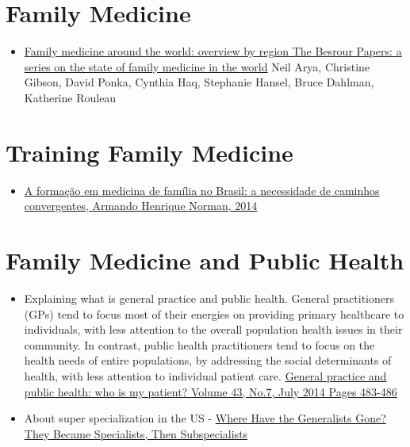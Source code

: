 \documentclass[]{book}
\providecommand{\tightlist}{%
  \setlength{\itemsep}{0pt}\setlength{\parskip}{0pt}}
\begin{document}
\begin{itemize}
\end{itemize}

\hypertarget{family-medicine}{%
\section*{Family Medicine}\label{family-medicine}}

\begin{itemize}
\tightlist
\item
  \href{https://www.ncbi.nlm.nih.gov/pmc/articles/PMC5471080/pdf/0630436.pdf}{Family medicine around the world: overview by region The Besrour Papers: a series on the state of family medicine in the world} Neil Arya, Christine Gibson, David Ponka, Cynthia Haq, Stephanie Hansel, Bruce Dahlman, Katherine Rouleau
\end{itemize}

\hypertarget{training-family-medicine}{%
\section*{Training Family Medicine}\label{training-family-medicine}}

\begin{itemize}
\tightlist
\item
  \href{https://www.rbmfc.org.br/rbmfc/article/view/875}{A formação em medicina de família no Brasil: a necessidade de caminhos convergentes, Armando Henrique Norman, 2014}
\end{itemize}

\hypertarget{family-medicine-and-public-health}{%
\section*{Family Medicine and Public Health}\label{family-medicine-and-public-health}}

\begin{itemize}
\item
  Explaining what is general practice and public health. General practitioners (GPs) tend to focus most of their energies on providing primary healthcare to individuals, with less attention to the overall population health issues in their community. In contrast, public health practitioners tend to focus on the health needs of entire populations, by addressing the social determinants of health, with less attention to individual patient care.
  \href{https://www.racgp.org.au/afp/2014/july/who-is-my-patient/}{General practice and public health: who is my patient? Volume 43, No.7, July 2014 Pages 483-486}
\item
  About super specialization in the US - \href{https://www.amjmed.com/article/S0002-9343\%2817\%2930134-1/pdf}{Where Have the Generalists Gone? They Became Specialists, Then Subspecialists}
\end{itemize}
\end{document}
